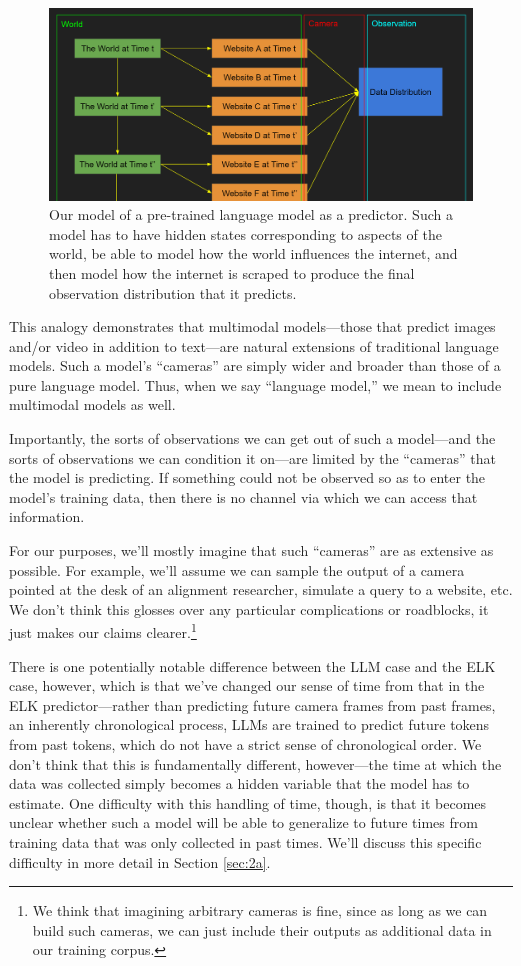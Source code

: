 \documentclass[
  onecolumn,
  natbib,
]{miri-tech-article}
\begin{document}
\begin{figure}[h!]
  \centering
  \includegraphics[width=\textwidth]{Mj4z48A.png}
  \caption{Our model of a pre-trained language model as a predictor. Such a model has to have hidden states corresponding to aspects of the world, be able to model how the world influences the internet, and then model how the internet is scraped to produce the final observation distribution that it predicts.}
\end{figure}

This analogy demonstrates that multimodal models---those that predict images and/or video in addition to text---are natural extensions of traditional language models. Such a model's ``cameras'' are simply wider and broader than those of a pure language model. Thus, when we say ``language model,'' we mean to include multimodal models as well.

Importantly, the sorts of observations we can get out of such a model---and the sorts of observations we can condition it on---are limited by the ``cameras'' that the model is predicting. If something could not be observed so as to enter the model's training data, then there is no channel via which we can access that information.

For our purposes, we'll mostly imagine that such ``cameras'' are as extensive as possible. For example, we'll assume we can sample the output of a camera pointed at the desk of an alignment researcher, simulate a query to a website, etc. We don't think this glosses over any particular complications or roadblocks, it just makes our claims clearer.\footnote{We think that imagining arbitrary cameras is fine, since as long as we can build such cameras, we can just include their outputs as additional data in our training corpus.}

There is one potentially notable difference between the LLM case and the ELK case, however, which is that we've changed our sense of time from that in the ELK predictor---rather than predicting future camera frames from past frames, an inherently chronological process, LLMs are trained to predict future tokens from past tokens, which do not have a strict sense of chronological order. We don't think that this is fundamentally different, however---the time at which the data was collected simply becomes a hidden variable that the model has to estimate. One difficulty with this handling of time, though, is that it becomes unclear whether such a model will be able to generalize to future times from training data that was only collected in past times. We'll discuss this specific difficulty in more detail in Section \ref{sec:2a}.
\end{document}

